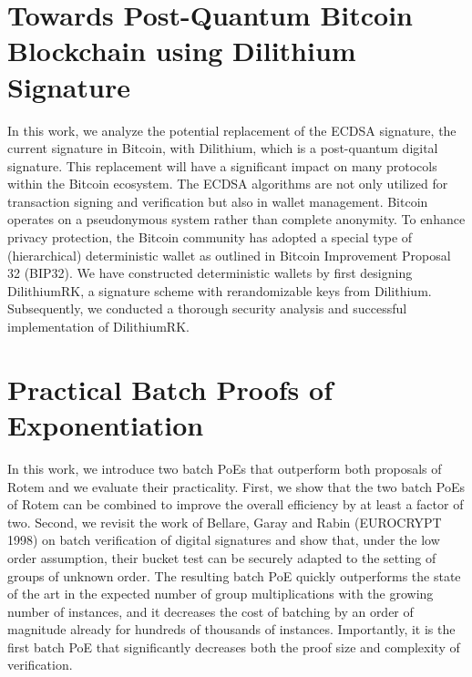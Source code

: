 \documentclass[11pt,oneside]{book}
\theoremstyle{definition}
\theoremstyle{remark}
\theoremstyle{plain}
\begin{document}
\section{\cite{10.62056/ak5wom2hd} Towards Post-Quantum Bitcoin Blockchain using Dilithium Signature}
In this work, we analyze the potential replacement of the ECDSA signature, the current signature in Bitcoin, with Dilithium, which is a post-quantum digital signature. This replacement will have a significant impact on many protocols within the Bitcoin ecosystem. The ECDSA algorithms are not only utilized for transaction signing and verification but also in wallet management. Bitcoin operates on a pseudonymous system rather than complete anonymity. To enhance privacy protection, the Bitcoin community has adopted a special type of (hierarchical) deterministic wallet as outlined in Bitcoin Improvement Proposal 32 (BIP32). We have constructed deterministic wallets by first designing DilithiumRK, a signature scheme with rerandomizable keys from Dilithium. Subsequently, we conducted a thorough security analysis and successful implementation of DilithiumRK.
\section{\cite{10.62056/abvur-iuc} Practical Batch Proofs of Exponentiation}
In this work, we introduce two batch PoEs that outperform both proposals of Rotem and we evaluate their practicality. First, we show that the two batch PoEs of Rotem can be combined to improve the overall efficiency by at least a factor of two. Second, we revisit the work of Bellare, Garay and Rabin (EUROCRYPT 1998) on batch verification of digital signatures and show that, under the low order assumption, their bucket test can be securely adapted to the setting of groups of unknown order. The resulting batch PoE quickly outperforms the state of the art in the expected number of group multiplications with the growing number of instances, and it decreases the cost of batching by an order of magnitude already for hundreds of thousands of instances. Importantly, it is the first batch PoE that significantly decreases both the proof size and complexity of verification.
\end{document}
